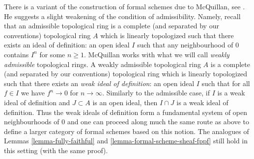 \begin{remark}
\label{remark-mcquillan}
There is a variant of the construction of formal schemes due to
McQuillan, see \cite{McQuillan}.
He suggests a slight weakening of the condition of admissibility.
Namely, recall that an admissible topological ring is a complete
(and separated by our conventions) topological ring $A$
which is linearly topologized such that there exists an
ideal of definition: an
open ideal $I$ such that any neighbourhood of $0$ contains $I^n$
for some $n \geq 1$.
McQuillan works with what we will call {\it weakly admissible}
topological rings. A weakly admissible topological ring $A$ is a
complete (and separated by our conventions) topological ring
which is linearly topologized such that there exists an
{\it weak ideal of definition}: an open ideal $I$ such that
for all $f \in I$ we have
$f^n \to 0$ for $n \to \infty$. Similarly to the admissible case,
if $I$ is a weak ideal of definition and $J \subset A$ is an
open ideal, then $I \cap J$ is a weak ideal of definition.
Thus the weak ideals of definition form a fundamental system of
open neighbourhoods of $0$ and
one can proceed along much the same route as above
to define a larger category of formal schemes based
on this notion. The analogues of Lemmas \ref{lemma-fully-faithful} and
\ref{lemma-formal-scheme-sheaf-fppf}
still hold in this setting (with the same proof).
\end{remark}

